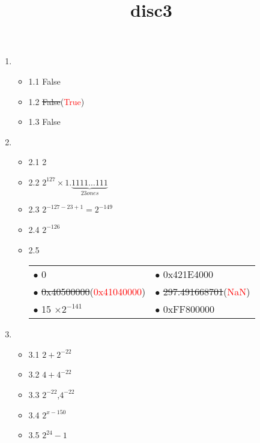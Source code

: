 \documentclass[12pt,a4paper]{article}
\title{disc3}
\begin{document}
	\maketitle
\begin{enumerate}
	\item \begin{itemize}
		\item 1.1 False 
		\item 1.2 \sout{False}(\textcolor{red}{True})
		\item 1.3 False
	\end{itemize}
	\item \begin{itemize}
		\item 2.1 2
		\item 2.2 $ 2^{127} \times 1.\underbrace{1111\dots111}_{23 ones} $
		\item 2.3 $ 2^{-127 - 23 + 1} = 2^{-149} $
		\item 2.4 $ 2^{-126} $
		\item 2.5 \begin{table}[h]
			\begin{tabular}{ll}
				$ \bullet $ 0 & $ \bullet $ 0x421E4000\\
				$ \bullet $ \sout{0x40500000}(\textcolor{red}{0x41040000})    & $ \bullet $ \sout{297.491668701}(\textcolor{red}{NaN})\\
				$ \bullet $ 15 $ \times 2^{-141}$ & $ \bullet $ 0xFF800000  
			\end{tabular}
					\end{table}
	\end{itemize}
	\item \begin{itemize}
		\item 3.1 $ 2 + 2 ^ {-22} $
		\item 3.2 $ 4 + 4 ^ {-22} $
		\item 3.3 $ 2^{-22} $,$ 4^{-22} $
		\item 3.4 $ 2^{x-150} $
		\item 3.5 $ 2^{24} - 1 $
	\end{itemize}
\end{enumerate}
\end{document}
